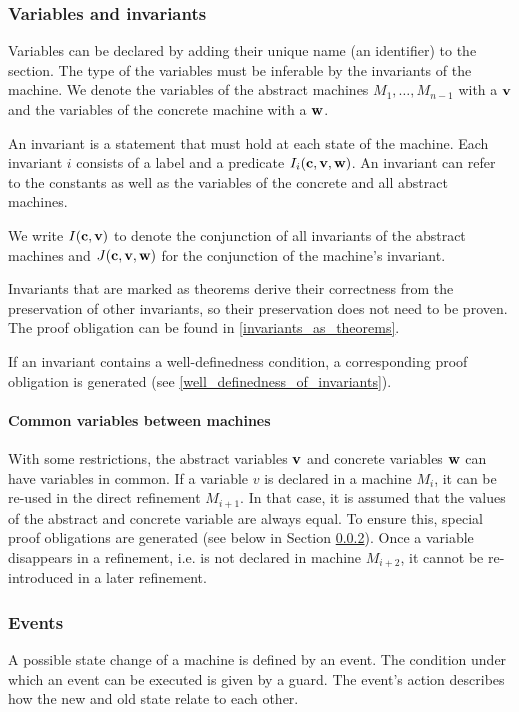 \subsubsection{Variables and invariants}
\label{variables_and_invariants}
Variables can be declared by adding their unique name (an identifier) to the  section. 
The type of the variables must be inferable by the invariants of the machine.
We denote the variables of the abstract machines $M_1,\ldots,M_{n-1}$ with a $\mathbf{v}$ and the variables of the concrete machine with a $\mathbf{w}$.

An invariant is a statement that must hold at each state of the machine.
Each invariant $i$ consists of a label and a predicate $I_i(\mathbf{c},\mathbf{v},\mathbf{w})$.
An invariant can refer to the constants as well as the variables of the concrete and all abstract machines.

We write $I(\mathbf{c},\mathbf{v})$ to denote the conjunction of all invariants
of the abstract machines and $J(\mathbf{c},\mathbf{v},\mathbf{w})$ for the conjunction of the machine's invariant.

Invariants that are marked as theorems derive their correctness from the preservation
  of other invariants, so their preservation does not need to be proven.
The proof obligation can be found in \ref{invariants_as_theorems}.

If an invariant contains a well-definedness condition, 
  a corresponding proof obligation is generated (see \ref{well_definedness_of_invariants}).

\paragraph{Common variables between machines}
\label{common_variables}
With some restrictions, the abstract variables $\mathbf{v}$ and concrete
  variables $\mathbf{w}$ can have variables in common.
If a variable $v$ is declared in a machine $M_i$, it can be re-used in the
  direct refinement $M_{i+1}$. 
In that case, it is assumed that the values of the abstract and concrete variable 
  are always equal.
To ensure this, special proof obligations are generated (see below in Section \ref{events}).
Once a variable disappears in a refinement, i.e. is not declared in machine $M_{i+2}$,
  it cannot be re-introduced in a later refinement.

\subsubsection{Events}
\label{events}
A possible state change of a machine is defined by an event.
The condition under which an event can be executed is given by a guard. The event's action
describes how the new and old state relate to each other.

